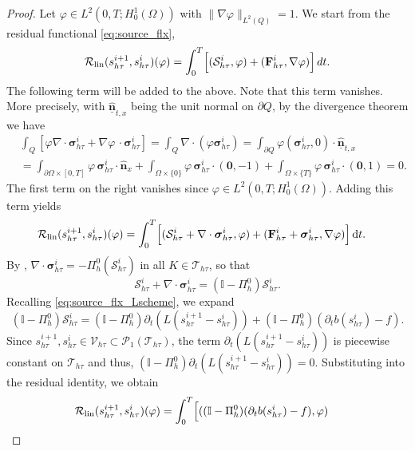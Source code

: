 \documentclass[review,11pt]{article}
\numberwithin{equation}{section}
\def \f  {\varphi}
\def \Om {\Omega}
\def \p  {\partial}
\def \dd {\mathrm{d}}
\def \htt {{h\tau}}
\def \flx {\bm{\sigma}_{\htt}^i}
\begin{document}
\begin{proof}
Let $\varphi \in L^2(0,T;H^1_0(\Omega))$ with $\|\nabla\varphi\|_{L^2(Q)} = 1$.
We start from the residual functional \eqref{eq:source_flx},
\[
 \mathcal{R}_{\rm lin}(s^{i+1}_{h\tau}, s^i_{h\tau})(\varphi)
= \int_0^T\!\Big[(\mathcal{S}^i_{h\tau},\varphi) + (\mathbf{F}^i_{h\tau},\nabla\varphi)\Big]\,dt.
\]
The following term will be added to the above. Note that this term vanishes. More precisely, with $\hat{\underline{\bm{n}}}_{t,x}$ being the unit normal on $\p Q$, by the divergence theorem we have
\begin{align*}
    &\int_{Q} \left[\f\nabla \cdot \flx + \nabla \f\,\cdot \flx\right]= \int_{Q}\nabla \cdot (\f\flx) = \int_{\p Q} \f (\flx,0)\cdot \hat{\underline{\bm{n}}}_{t,x}\\
    &= \int_{\p \Om\times [0,T]} \f \,\flx\cdot \hat{\bm{n}}_{x} +  \int_{\Om\times \{0\}} \f \,\flx\cdot (\bm{0},-1) +  \int_{\Om\times \{T\}} \f\, \flx\cdot (\bm{0},1)=0.
\end{align*}
The first term on the right vanishes since  $\varphi\in L^2(0,T;H^1_0(\Om))$. Adding this term yields
\begin{align*}
 \mathcal{R}_{\rm lin}(s^{i+1}_{h\tau}, s^i_{h\tau})(\varphi)
&= \int_0^T\!\Big[(\mathcal{S}^i_{h\tau} + \nabla\cdot\boldsymbol{\sigma}^i_{h\tau},\varphi)
+ (\mathbf{F}^i_{h\tau} + \boldsymbol{\sigma}^i_{h\tau},\nabla\varphi)\Big]\,\dd t.
\end{align*}
By , $\nabla\cdot\boldsymbol{\sigma}^i_{h\tau} = -\Pi^0_h(\mathcal{S}^i_{h\tau})$ in all $K\in\mathcal{T}_{h\tau}$, so that
\[
\mathcal{S}^i_{h\tau} + \nabla\cdot\boldsymbol{\sigma}^i_{h\tau}
= (\mathbb{I}-\Pi^0_h)\mathcal{S}^i_{h\tau}.
\]
Recalling \eqref{eq:source_flx_Lscheme}, we expand
\[
(\mathbb{I}-\Pi^0_h)\mathcal{S}^i_{h\tau}
= (\mathbb{I}-\Pi^0_h)\partial_t\!\left(L(s^{i+1}_{h\tau}-s^i_{h\tau})\right)
+ (\mathbb{I}-\Pi^0_h)\left(\partial_t b(s^i_{h\tau})-f\right).
\]
Since $s^{i+1}_{h\tau}, s^i_{h\tau}\in\mathcal{V}_{h\tau}\subset\mathcal{P}_1(\mathcal{T}_{h\tau})$, the term $\partial_t(L(s^{i+1}_{h\tau}-s^i_{h\tau}))$ is piecewise constant on $\mathcal{T}_{h\tau}$ and thus, $(\mathbb{I}-\Pi^0_h)\partial_t\!\left(L(s^{i+1}_{h\tau}-s^i_{h\tau})\right) = 0$.
Substituting into the residual identity, we obtain
\begin{align}\label{eq:res-identity}
\mathcal{R}_{\rm lin}(s^{i+1}_{h\tau}, s^i_{h\tau})(\varphi)
&= \int_0^T\!\Big[((\mathbb{I}-\Pi^0_h)(\partial_t b(s^i_{h\tau})-f),\varphi)

\end{align}
\end{proof}
\end{document}
